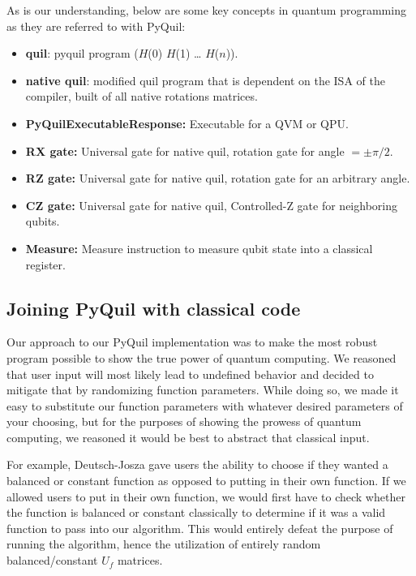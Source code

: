 \documentclass[12pt]{article}
\begin{document}
As is our understanding, below are some key concepts in quantum programming as they are referred to with PyQuil:
\begin{itemize}
    \item \textbf{quil}: pyquil program ($H$(0) $H$(1) … $H$($n$)).
    \item \textbf{native quil}: modified quil program that is dependent on the ISA of the compiler, built of all native rotations matrices.
    \item \textbf{PyQuilExecutableResponse:} Executable for a QVM or QPU.
    \item \textbf{RX gate:} Universal gate for native quil, rotation gate for angle $= \pm\pi/2$.
    \item \textbf{RZ gate:} Universal gate for native quil, rotation gate for an arbitrary angle.
    \item \textbf{CZ gate:} Universal gate for native quil, Controlled-Z gate for neighboring qubits.
    \item \textbf{Measure:} Measure instruction to measure qubit state into a classical register.
\end{itemize}

\subsection{Joining PyQuil with classical code}

Our approach to our PyQuil implementation was to make the most robust program possible to show the true power of quantum computing.
We reasoned that user input will most likely lead to undefined behavior and decided to mitigate that by randomizing function parameters.
While doing so, we made it easy to substitute our function parameters with whatever desired parameters of your choosing, but for the purposes of showing the prowess of quantum computing, we reasoned it would be best to abstract that classical input.

For example, Deutsch-Josza gave users the ability to choose if they wanted a balanced or constant function as opposed to putting in their own function.
If we allowed users to put in their own function, we would first have to check whether the function is balanced or constant classically to determine if it was a valid function to pass into our algorithm.
This would entirely defeat the purpose of running the algorithm, hence the utilization of entirely random balanced/constant $U_f$ matrices.
\end{document}
